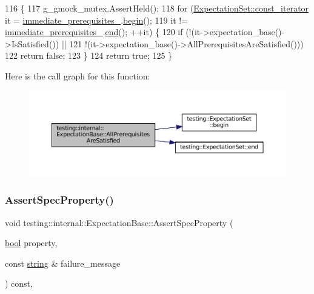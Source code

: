 \begin{DoxyCode}
116                                                   \{
117   g\_gmock\_mutex.AssertHeld();
118   \textcolor{keywordflow}{for} (\hyperlink{classtesting_1_1ExpectationSet_ab269a45f80d8c4f747b29de454a084bb}{ExpectationSet::const\_iterator} it = 
      \hyperlink{classtesting_1_1internal_1_1ExpectationBase_a186eff0fdcacc8c1e1a2becdec11d3cd}{immediate\_prerequisites\_}.\hyperlink{classtesting_1_1ExpectationSet_ad7b8b900ef3f3e35a5d93aecd452504c}{begin}();
119        it != \hyperlink{classtesting_1_1internal_1_1ExpectationBase_a186eff0fdcacc8c1e1a2becdec11d3cd}{immediate\_prerequisites\_}.\hyperlink{classtesting_1_1ExpectationSet_aac2a004529006c827e4d3420c4d4187a}{end}(); ++it) \{
120     \textcolor{keywordflow}{if} (!(it->expectation\_base()->IsSatisfied()) ||
121         !(it->expectation\_base()->AllPrerequisitesAreSatisfied()))
122       \textcolor{keywordflow}{return} \textcolor{keyword}{false};
123   \}
124   \textcolor{keywordflow}{return} \textcolor{keyword}{true};
125 \}
\end{DoxyCode}
Here is the call graph for this function\+:
\nopagebreak
\begin{figure}[H]
\begin{center}
\leavevmode
\includegraphics[width=350pt]{classtesting_1_1internal_1_1ExpectationBase_a82ba68cdd71a8b5aff5a5be24c23a637_cgraph}
\end{center}
\end{figure}
\mbox{\label{classtesting_1_1internal_1_1ExpectationBase_a2644117ae8b59bd19aa526549a11d84e}} 
\subsubsection{\texorpdfstring{Assert\+Spec\+Property()}{AssertSpecProperty()}}
{\footnotesize\ttfamily void testing\+::internal\+::\+Expectation\+Base\+::\+Assert\+Spec\+Property (\begin{DoxyParamCaption}\item[{\hyperlink{classbool}{bool}}]{property,  }\item[{const \hyperlink{namespacetesting_1_1internal_a8e8ff5b11e64078831112677156cb111}{string} \&}]{failure\+\_\+message }\end{DoxyParamCaption}) const\hspace{0.3cm}{\ttfamily [inline]}, {\ttfamily [protected]}}



